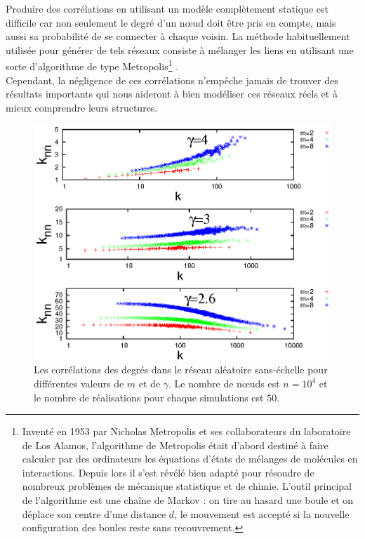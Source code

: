 Produire des corrélations en utilisant un modèle complètement statique est difficile car non seulement le degré d'un nœud doit être pris en compte, mais aussi sa probabilité de se connecter à chaque voisin. La méthode habituellement utilisée pour générer de tels réseaux consiste à mélanger les liens en utilisant une sorte d'algorithme de type Metropolis\footnote{Inventé en 1953 par Nicholas Metropolis et ses collaborateurs du laboratoire de Los Alamos, l'algorithme de Metropolis était d'abord destiné à faire calculer par des ordinateurs les équations d'états de mélanges de molécules en interactions. Depuis lors il s'est révélé bien adapté pour résoudre de nombreux problèmes de mécanique statistique et de chimie. L'outil principal de l'algorithme est une chaîne de Markov : on tire au hasard une boule et on déplace son centre d'une distance $d$, le mouvement est accepté si la nouvelle configuration des boules reste sans recouvrement.} \cite{Metropolis-al1953}.\\ Cependant, la négligence de ces corrélations n'empêche jamais de trouver des résultats importants qui nous aideront à bien modéliser ces réseaux réels et à mieux comprendre leurs structures. 
\begin{figure}[h!]
	\centering
	\includegraphics[scale=1.2]{./figures/correlation}
	\caption{Les corrélations des degrés dans le réseau aléatoire sans-échelle pour différentes valeurs de $m$ et de $\gamma$. Le nombre de nœuds est $n=10^4$ et le nombre de réalisations pour chaque simulations est $50$.}
	\label{correlation}
\end{figure}
\vspace{3cm}


